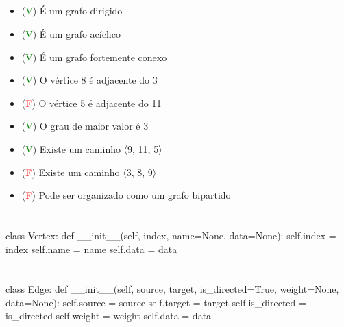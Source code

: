 \documentclass{article}
\begin{document}
    \subsection{}
        \begin{itemize}
            \item[] (\textcolor{green}{V}) É um grafo dirigido
            \item[] (\textcolor{green}{V}) É um grafo acíclico
            \item[] (\textcolor{green}{V}) É um grafo fortemente conexo
            \item[] (\textcolor{green}{V}) O vértice 8 é adjacente do 3
            \item[] (\textcolor{red}{F}) O vértice 5 é adjacente do 11
            \item[] (\textcolor{green}{V}) O grau de maior valor é 3
            \item[] (\textcolor{green}{V}) Existe um caminho 〈9, 11, 5〉
            \item[] (\textcolor{red}{F}) Existe um caminho 〈3, 8, 9〉
            \item[] (\textcolor{red}{F}) Pode ser organizado como um grafo bipartido
        \end{itemize}
\section{} %
\begin{python}
class Vertex:
    def __init__(self, index, name=None, data=None):
        self.index = index
        self.name = name
        self.data = data
    
\end{python}
\href{https://github.com/aejunior/bsi-ed-ii/blob/master/src/graph/Vertex.py}{\faGithub}

\section{} %
\begin{python}
class Edge:
    def __init__(self, source, target, is_directed=True, weight=None, data=None):
        self.source = source
        self.target = target
        self.is_directed = is_directed
        self.weight = weight
        self.data = data
\end{python}
\href{https://github.com/aejunior/bsi-ed-ii/blob/master/src/graph/Edge.py}{\faGithub}
\end{document}
